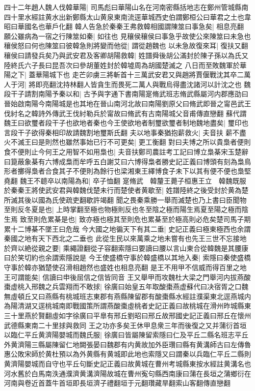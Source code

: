 四十二年趙人魏人伐韓華陽|{
	司馬彪曰華陽山名在河南密縣括地志在鄭州管城縣南四十里水經註黄水出新鄭縣太山黄泉東南流逕華城西史伯謂鄭桓公曰華君之土也韋昭曰華國名也華戶化翻}
韓人告急於秦秦王弗救韓相國謂陳筮曰事急矣|{
	相息亮翻}
願公雖病為一宿之行陳筮如秦|{
	如往也}
見穰侯穰侯曰事急乎故使公來陳筮曰未急也穰侯怒曰何也陳筮曰彼韓急則將變而他從|{
	謂從趙魏也}
以未急故復來耳|{
	復扶又翻}
穰侯曰請發兵矣乃與武安君及客卿胡陽救韓|{
	姓譜舜後胡公滿封於陳子孫以為氏又陸終氏六子長曰昆吾次曰參胡董姓封於韓墟周為胡國楚滅之}
八日而至敗魏軍於華陽之下|{
	蓋華陽城下也}
走芒卯虜三將斬首十三萬武安君又與趙將賈偃戰沈其卒二萬人于河|{
	將即亮翻沈持林翻人皆貪生而畏死二萬人與戰烏得盡沈諸河以計沈之也}
魏段干子請割南陽予秦以和|{
	古予與字通下書南陽寔脩武班志脩武縣屬河内郡應劭曰晉始啟南陽今南陽城是也其地在晉山南河北故曰南陽劉原父曰脩武即晉之甯邑武王伐紂名之韓詩外傳武王伐紂勒兵於甯故曰脩武有古南陽城父音甫傳直戀翻}
蘇代謂魏王曰欲璽者段干子也欲地者秦也今王使欲地者制璽欲璽者制地魏地盡矣|{
	璽印也言段干子欲得秦相印故請魏割地璽斯氏翻}
夫以地事秦猶抱薪救火|{
	夫音扶}
薪不盡火不滅王曰是則然也雖然事始已行不可更矣|{
	更工衡翻}
對曰夫博之所以貴梟者便則食不便則止今何王之用智不如用梟也|{
	夫音扶鄭司農註考工記曰博立梟棊宋玉楚辭曰箟蔽象棊有六博成梟而牟呼五白謝艾曰六博得梟者勝史記正義曰博頭有刻為梟鳥形者擲得梟者合食其子不便則為餘行也梁湘東王繹博食子未下以其有便不便也梟堅堯翻}
魏王不聼卒以南陽為和|{
	卒子恤翻}
寔脩武　韓釐王薨子桓惠王立　韓魏既服於秦秦王將使武安君與韓魏伐楚未行而楚使者黄歇至|{
	姓譜陸終之後受封於黄為楚所滅其後以國為氏使疏吏翻歇許竭翻}
聞之畏秦乘勝一舉而滅楚也乃上書曰臣聞物至則反冬夏是也|{
	上時掌翻至極也物極則反也冬至陰之極而陽生焉夏至陽之極而陰生焉}
致至則危累棊是也|{
	致亦極也極其至則危也累棊至於極高則必危矣楚司馬子期累十二博棊不墜王曰危哉}
今大國之地徧天下有其二垂|{
	史記正義曰極東極西也余謂秦國之地有天下西北之二垂也}
此從生民以來萬乘之地未嘗有也先王三世不忘接地於齊以絶從親之要|{
	乘繩證翻從子容翻索隱曰要讀曰腰以言山東合從韓魏是其腰康曰於笑切約也余謂索隱說是}
今王使盛橋守事於韓盛橋以其地入秦|{
	索隱曰秦使盛橋守事於韓亦猶楚使召滑相趙然也盛姓也相息亮翻}
是王不用甲不信威而得百里之地王可謂能矣|{
	信讀曰申後屈信之信皆同音}
王又舉甲而攻魏杜大梁之門舉河内拔燕酸棗虚桃入邢魏之兵雲翔而不敢捄|{
	徐廣曰始皇五年取酸棗燕虚蘇代曰决宿胥之口魏無虛頓丘又曰燕縣有桃城班志東郡有燕縣陳留郡有酸棗縣水經註濮渠東北逕燕城内為陽清湖又逕桃城南即戰國策所謂燕酸棗虛桃者史記正義曰故桃城在滑州昨城縣東三十里燕於賢翻虛如字徐廣曰平臯有邢丘劉昭曰邢丘故邢國史記正義曰邢丘在懷州武德縣東南二十里捄與救同}
王之功亦多矣王休甲息衆三年而後復之又并蒲衍首垣以臨仁平丘黄濟陽嬰城而魏氏服|{
	徐廣曰皆屬陳留索隱曰仁及平丘二縣名班志平丘外黄濟陽三縣屬陳留仁地闕張晏曰魏郡有内黄故加外臣瓚曰縣有黄溝師古曰左傳魯惠公敗宋師於黄杜預以為外黄縣有黄城即此地也索隱又曰謂秦以兵臨仁平丘二縣則黄濟陽嬰城而自守也平丘句斷史記正義曰故黄城在曹州考城縣東按水經註黄溝名也河水舊於白馬南泆通濮濟黄溝濟陽故城在曹州寃句縣西南康曰蒲在長垣之蒲鄉衍在河南與卷近首蓋牛首垣即長垣濟子禮翻垣于元翻瓚藏旱翻索山客翻傳直戀翻}

